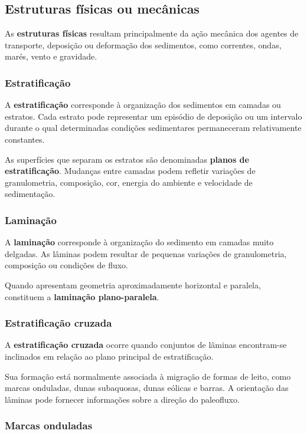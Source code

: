 \documentclass[a4paper,12pt]{article}
\theoremstyle{definition}
\theoremstyle{definition}
\theoremstyle{definition}
\begin{document}
\subsection{Estruturas físicas ou mecânicas}

As \textbf{estruturas físicas} resultam principalmente da ação mecânica dos
agentes de transporte, deposição ou deformação dos sedimentos, como correntes,
ondas, marés, vento e gravidade.

\subsubsection{Estratificação}

A \textbf{estratificação} corresponde à organização dos sedimentos em camadas ou
estratos. Cada estrato pode representar um episódio de deposição ou um intervalo
durante o qual determinadas condições sedimentares permaneceram relativamente
constantes.

As superfícies que separam os estratos são denominadas
\textbf{planos de estratificação}. Mudanças entre camadas podem refletir
variações de granulometria, composição, cor, energia do ambiente e velocidade de
sedimentação.

\subsubsection{Laminação}

A \textbf{laminação} corresponde à organização do sedimento em camadas muito
delgadas. As lâminas podem resultar de pequenas variações de granulometria,
composição ou condições de fluxo.

Quando apresentam geometria aproximadamente horizontal e paralela, constituem a
\textbf{laminação plano-paralela}.

\subsubsection{Estratificação cruzada}

A \textbf{estratificação cruzada} ocorre quando conjuntos de lâminas encontram-se
inclinados em relação ao plano principal de estratificação.

Sua formação está normalmente associada à migração de formas de leito, como
marcas onduladas, dunas subaquosas, dunas eólicas e barras. A orientação das
lâminas pode fornecer informações sobre a direção do paleofluxo.

\subsubsection{Marcas onduladas}
\end{document}

